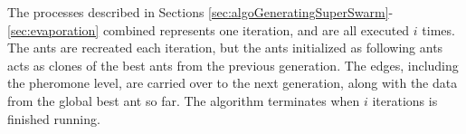 The processes described in Sections \ref{sec:algoGeneratingSuperSwarm}-\ref{sec:evaporation} combined represents one iteration, and are all executed $i$ times. The ants are recreated each iteration, but the ants initialized as following ants acts as clones of the best ants from the previous generation. The edges, including the pheromone level, are carried over to the next generation, along with the data from the global best ant so far. The algorithm terminates when $i$ iterations is finished running. 